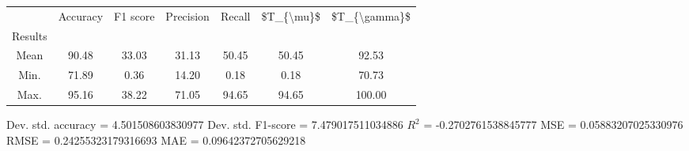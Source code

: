 \begin{tabular}{|c|c|c|c|c|c|c|}
\toprule
{} &  Accuracy &  F1 score &  Precision &  Recall &  \$T\_\{\textbackslash mu\}\$ &  \$T\_\{\textbackslash gamma\}\$ \\
Results &           &           &            &         &            &               \\
\hline
Mean    &     90.48 &     33.03 &      31.13 &   50.45 &      50.45 &         92.53 \\
Min.    &     71.89 &      0.36 &      14.20 &    0.18 &       0.18 &         70.73 \\
Max.    &     95.16 &     38.22 &      71.05 &   94.65 &      94.65 &        100.00 \\
\bottomrule
\end{tabular}

 Dev. std. accuracy = 4.501508603830977
 Dev. std. F1-score = 7.479017511034886
 $R^2$ = -0.2702761538845777
 MSE = 0.05883207025330976
 RMSE = 0.24255323179316693
 MAE = 0.09642372705629218
